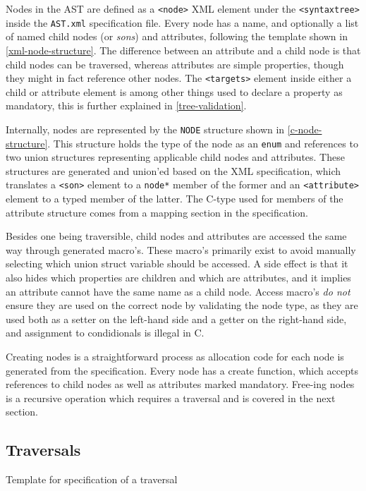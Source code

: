 \documentclass[twoside,openright]{uva-bachelor-thesis}
\newcommand{\code}[1]{\texttt{\footnotesize#1}}
\begin{document}
			Nodes in the AST are defined as a \code{<node>} XML element under the \code{<syntaxtree>} inside the \code{AST.xml} specification file. Every node has a name, and optionally a list of named child nodes (or \emph{sons}) and attributes, following the template shown in \cref{xml-node-structure}. The difference between an attribute and a child node is that child nodes can be traversed, whereas attributes are simple properties, though they might in fact reference other nodes. The \code{<targets>} element inside either a child or attribute element is among other things used to declare a property as mandatory, this is further explained in \cref{tree-validation}.
			
			Internally, nodes are represented by the \code{NODE} structure shown in \cref{c-node-structure}. This structure holds the type of the node as an \code{enum} and references to two union structures representing applicable child nodes and attributes. These structures are generated and union'ed based on the XML specification, which translates a \code{<son>} element to a \code{node*} member of the former and an \code{<attribute>} element to a typed member of the latter. The C-type used for members of the attribute structure comes from a mapping section in the specification.
			
			Besides one being traversible, child nodes and attributes are accessed the same way through generated macro's. These macro's primarily exist to avoid manually selecting which union struct variable should be accessed. A side effect is that it also hides which properties are children and which are attributes, and it implies an attribute cannot have the same name as a child node. Access macro's \emph{do not} ensure they are used on the correct node by validating the node type, as they are used both as a setter on the left-hand side and a getter on the right-hand side, and assignment to condidionals is illegal in C.
			
			Creating nodes is a straightforward process as allocation code for each node is generated from the specification. Every node has a create function, which accepts references to child nodes as well as attributes marked mandatory. Free-ing nodes is a recursive operation which requires a traversal and is covered in the next section.
			
		\subsection{Traversals}
		\label{c-trav}
			\begin{codebox}[label=xml-trav-structure]{Template for specification of a traversal}
			\end{codebox}
									
\end{document}
